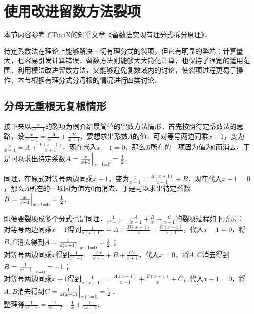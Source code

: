 \documentclass{ctexbook}
\begin{document}
\section{使用改进留数方法裂项}
本节内容参考了TianX的知乎文章《留数法实现有理分式拆分原理》．\par
待定系数法在理论上能够解决一切有理分式的裂项，但它有明显的弊端：计算量大，也容易引发计算错误．留数方法则能够大大简化计算，也保持了很宽的适用范围．利用模法改进留数方法，又能够避免复数域内的讨论，使裂项过程更易于操作．本节根据有理分式分母根的情况进行四类讨论．\par
\subsection{分母无重根无复根情形}
接下来以$\frac{x}{x^{2}-1}$的裂项为例介绍最简单的留数方法情形．首先按照待定系数法的思路，设$\frac{x}{x^{2}-1}=\frac{A}{x-1}+\frac{B}{x+1}$．要想求出系数$A$的值，可对等号两边同乘$x-1$，变为$\frac{x}{x+1}=A+\frac{B\left(x-1\right)}{x+1}$．现在代入$x-1=0$，那么$B$所在的一项因为值为$0$而消去．于是可以求出待定系数$A=\frac{x}{x+1}\Big{|}_{x-1=0}=\frac{1}{2}$．\par
同理，在原式对等号两边同乘$x+1$，变为$\frac{x}{x-1}=\frac{A\left(x+1\right)}{x-1}+B$．现在代入$x+1=0$，那么$A$所在的一项因为值为$0$而消去．于是可以求出待定系数$B=\frac{x}{x-1}\Big{|}_{x+1=0}=\frac{1}{2}$．\par
即便要裂项成多个分式也是同理．$\frac{1}{x^{3}-x}=\frac{A}{x-1}+\frac{B}{x}+\frac{C}{x+1}$的裂项过程如下所示：\\
对等号两边同乘$x-1$得到$\frac{1}{x\left(x+1\right)}=A+\frac{B\left(x-1\right)}{x}+\frac{C\left(x-1\right)}{x+1}$，代入$x-1=0$，将$B,C$消去得到$A=\frac{1}{x\left(x+1\right)}\Big{|}_{x-1=0}=\frac{1}{2}$；\\
对等号两边同乘$x$得到$\frac{1}{x^{2}-1}=\frac{Ax}{x-1}+B+\frac{Cx}{x+1}$，代入$x=0$，将$A,C$消去得到$B=\frac{1}{x^{2}-1}\Big{|}_{x=0}=-1$；\\
对等号两边同乘$x+1$得到$\frac{1}{x\left(x-1\right)}=\frac{A\left(x+1\right)}{x-1}+\frac{B\left(x+1\right)}{x}+C$，代入$x+1=0$，将$A,B$消去得到$C=\frac{1}{x\left(x-1\right)}\Big{|}_{x+1=0}=\frac{1}{2}$．\\
整理得$\frac{1}{x^{3}-x}=\frac{1}{2x-2}-\frac{1}{x}+\frac{1}{2x+2}$．\par
\end{document}
